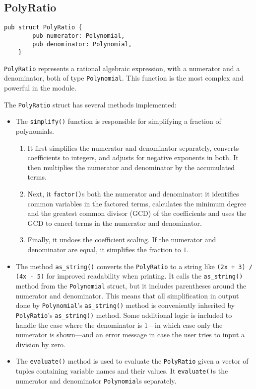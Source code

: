 \subsection{PolyRatio}\label{subsec:polyratio}

\begin{lstlisting}[caption={The \texttt{PolyRatio} struct}, label={lst:polyratio}]
    pub struct PolyRatio {
        pub numerator: Polynomial,
        pub denominator: Polynomial,
    }
\end{lstlisting}

\verb|PolyRatio| represents a rational algebraic expression, with a numerator and a denominator, both of type \verb|Polynomial|. This function is the most complex and powerful in the module.

The \verb|PolyRatio| struct has several methods implemented:

\begin{itemize}
    \item The \verb|simplify()| function is responsible for simplifying a fraction of polynomials.
    
    \begin{enumerate}
        \item It first simplifies the numerator and denominator separately, converts coefficients to integers, and adjusts for negative exponents in both. It then multiplies the numerator and denominator by the accumulated terms.
        \item Next, it \verb|factor()|s both the numerator and denominator: it identifies common variables in the factored terms, calculates the minimum degree and the greatest common divisor (GCD) of the coefficients and uses the GCD to cancel terms in the numerator and denominator.
        \item Finally, it undoes the coefficient scaling. If the numerator and denominator are equal, it simplifies the fraction to $1$.
    \end{enumerate}

    \item The method \verb|as_string()| converts the \verb|PolyRatio| to a string like \texttt{(2x + 3) / (4x - 5)} for improved readability when printing. It calls the \verb|as_string()| method from the \verb|Polynomial| struct, but it includes parentheses around the numerator and denominator. This means that all simplification in output done by \verb|Polynomial|'s \verb|as_string()| method is conveniently inherited by \verb|PolyRatio|'s \verb|as_string()| method. Some additional logic is included to handle the case where the denominator is $1$---in which case only the numerator is shown---and an error message in case the user tries to input a division by zero.
    \item The \verb|evaluate()| method is used to evaluate the \verb|PolyRatio| given a vector of tuples containing variable names and their values. It \verb|evaluate()|s the numerator and denominator \verb|Polynomial|s separately.

\end{itemize}

